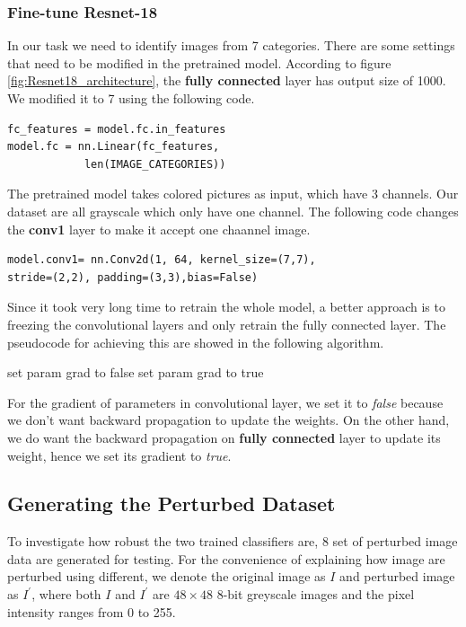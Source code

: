 \documentclass{article}
\begin{document}
\subsubsection{Fine-tune Resnet-18}

In our task we need to identify images from 7 categories. There are some settings that need to be modified in the pretrained model. According to figure \ref{fig:Resnet18_architecture}, the \textbf{fully connected} layer has output size of 1000. We modified it to 7 using the following code. 

\begin{verbatim}
fc_features = model.fc.in_features
model.fc = nn.Linear(fc_features, 
            len(IMAGE_CATEGORIES))
\end{verbatim}

The pretrained model takes colored pictures as input, which have 3 channels. Our dataset are all grayscale which only have one channel. The following code changes the \textbf{conv1} layer to make it accept one chaannel image.

\begin{verbatim}
model.conv1= nn.Conv2d(1, 64, kernel_size=(7,7), 
stride=(2,2), padding=(3,3),bias=False)
\end{verbatim}

Since it took very long time to retrain the whole model, a better approach is to freezing the convolutional layers and only retrain the fully connected layer. The pseudocode for achieving this are showed in the following algorithm.

\begin{algorithm}[ht]
\begin{algorithmic}
   \STATE set param grad to false
   \ENDFOR
   \STATE set param grad to true
   \ENDFOR
\end{algorithmic}
\end{algorithm}

For the gradient of parameters in convolutional layer, we set it to \textit{false} because we don't want backward propagation to update the weights. On the other hand, we do want the backward propagation on \textbf{fully connected} layer to update its weight, hence we set its gradient to \textit{true}.

\subsection{Generating the Perturbed Dataset}
To investigate how robust the two trained classifiers are, 8 set of perturbed image data are generated for testing. For the convenience of explaining how image are perturbed using different, we denote the original image as $I$ and perturbed image as $I^{'}$, where both $I$ and $I^{'}$ are $48 \times 48$ 8-bit greyscale images and the pixel intensity ranges from 0 to 255.
\end{document}
